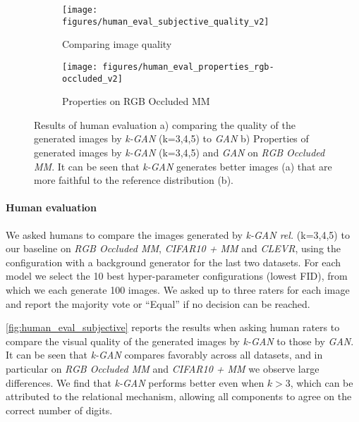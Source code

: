 \documentclass{article}
\begin{document}
\begin{figure}
\begin{subfigure}{.5\textwidth}
  \centering
  \texttt{[image: figures/human\_eval\_subjective\_quality\_v2]}
  \caption{Comparing image quality}
  \label{fig:human_eval_subjective}
\end{subfigure}%
\begin{subfigure}{0.5\textwidth}
  \centering
  \texttt{[image: figures/human\_eval\_properties\_rgb-occluded\_v2]}
  \caption{Properties on RGB Occluded MM}
  \label{fig:human_eval_properties_rgb_occluded}
\end{subfigure}
\caption{Results of human evaluation a) comparing the quality of the generated images by \emph{k-GAN} (k=3,4,5) to \emph{GAN} b) Properties of generated images by \emph{k-GAN} (k=3,4,5) and \emph{GAN} on \emph{RGB Occluded MM}. It can be seen that \emph{k-GAN} generates better images (a) that are more faithful to the reference distribution (b).}
\end{figure}\paragraph{Human evaluation}
We asked humans to compare the images generated by \emph{k-GAN rel.} (k=3,4,5) to our baseline on \emph{RGB Occluded MM}, \emph{CIFAR10 + MM} and \emph{CLEVR}, using the configuration with a background generator for the last two datasets.
For each model we select the 10 best hyper-parameter configurations (lowest FID), from which we each generate 100 images.
We asked up to three raters for each image and report the majority vote or ``Equal'' if no decision can be reached.

\autoref{fig:human_eval_subjective} reports the results when asking human raters to compare the visual quality of the generated images by \emph{k-GAN} to those by \emph{GAN}.
It can be seen that \emph{k-GAN} compares favorably across all datasets, and in particular on \emph{RGB Occluded MM} and \emph{CIFAR10 + MM} we observe large differences.
We find that \emph{k-GAN} performs better even when $k>3$, which can be attributed to the relational mechanism, allowing all components to agree on the correct number of digits.

\end{document}
